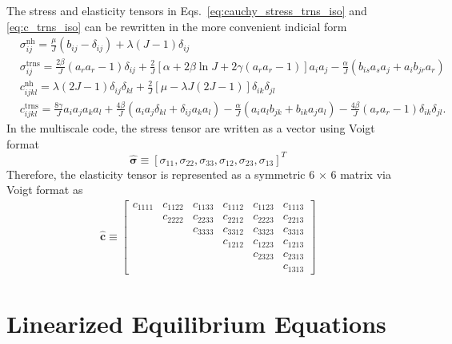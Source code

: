 The stress and elasticity tensors in Eqs.\ \eqref{eq:cauchy_stress_trns_iso} and \eqref{eq:c_trns_iso} can be rewritten in the more convenient indicial form
%
\begin{align}
&\sigma^{\text{nh}}_{ij} = \frac{\mu}{J}(b_{ij} - \delta_{ij}) + \lambda(J-1)\delta_{ij} \nonumber\\
%
&\sigma^{\text{trns}}_{ij} = \frac{2\beta}{J}(a_r a_r - 1)\delta_{ij} + \frac{2}{J}[\alpha+2\beta\ln J+2\gamma(a_r a_r -1)]a_i a_j - \frac{\alpha}{J}(b_{is}a_s a_j+a_i b_{jr}a_r) \nonumber\\
%
&c^{\text{nh}}_{ijkl} = \lambda(2J-1)\delta_{ij}\delta_{kl} + \frac{2}{J}[\mu - \lambda J(2J-1)]\delta_{ik}\delta_{jl} \nonumber\\
%
&c^{\text{trns}}_{ijkl} = \frac{8\gamma}{J}a_i a_j a_k a_l + \frac{4\beta}{J}(a_i a_j \delta_{kl} + \delta_{ij}a_k a_l) - \frac{\alpha}{J}(a_i a_l b_{jk} + b_{ik}a_j a_l) - \frac{4\beta}{J}(a_r a_r - 1)\delta_{ik}\delta_{jl}.
\label{eq:inidicial_form}
\end{align}
%
In the multiscale code, the stress tensor are written as a vector using Voigt format
%
\begin{equation}
\hat{\pmb{\sigma}} \equiv  [\sigma_{11}, \sigma_{22}, \sigma_{33}, \sigma_{12}, \sigma_{23}, \sigma_{13}]^T
\end{equation}
%
Therefore, the elasticity tensor is represented as a symmetric 6 $\times$ 6 matrix via Voigt format as
%
\begin{eqnarray}
\hat{\pmb{c}} \equiv 
\begin{bmatrix}
c_{1111} & c_{1122} & c_{1133} & c_{1112} & c_{1123} & c_{1113} \\
              & c_{2222} & c_{2233} & c_{2212} & c_{2223} & c_{2213} \\
              &                & c_{3333} & c_{3312} & c_{3323} & c_{3313} \\
              &                &                & c_{1212} & c_{1223} & c_{1213} \\
              &                &                &                & c_{2323} & c_{2313} \\
              &                &                &                &                & c_{1313}       
\end{bmatrix}
\end{eqnarray}
% 
\section{Linearized Equilibrium Equations}

